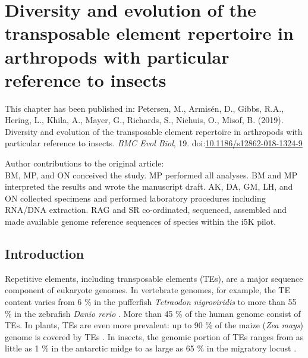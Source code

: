 
\chapter{Diversity and evolution of the transposable element repertoire
in arthropods with particular reference to insects} \label{cha:mobilome}

\newpage

This chapter has been published in:
Petersen, M., Armis\'en, D., Gibbs, R.A., Hering, L., Khila, A., Mayer, G.,
Richards, S., Niehuis, O.,  Misof, B. (2019). Diversity and evolution of the
transposable element repertoire in arthropods with particular reference to
insects. \emph{BMC Evol Biol}, 19.
doi:\href{https://dx.doi.org/10.1186/s12862-018-1324-9}{10.1186/s12862-018-1324-9}


Author contributions to the original article:\\
BM, MP, and ON conceived the study. MP performed all analyses. BM and MP
interpreted the results and wrote the manuscript draft. AK, DA, GM, LH, and
ON collected specimens and performed laboratory procedures including
RNA/DNA extraction. RAG and SR co-ordinated, sequenced, assembled and
made available genome reference sequences of species within the i5K pilot.

\section{Introduction}

Repetitive elements, including transposable elements (TEs), are a major
sequence component of eukaryote genomes. In vertebrate genomes, for
example, the TE content varies from 6 \% in the pufferfish
\emph{Tetraodon nigroviridis} to more than 55 \% in the zebrafish
\emph{Danio rerio} \citep{Chalopin2015}. More than 45 \% of the human
genome \citep{deKoning2011} consist of TEs. In plants, TEs are even more
prevalent: up to 90 \% of the maize (\emph{Zea mays}) genome is covered
by TEs \citep{SanMiguel1996}. In insects, the genomic portion of TEs
ranges from as little as 1 \% in the antarctic midge \citep{Kelley2014}
to as large as 65 \% in the migratory locust \citep{Wang2014}.

